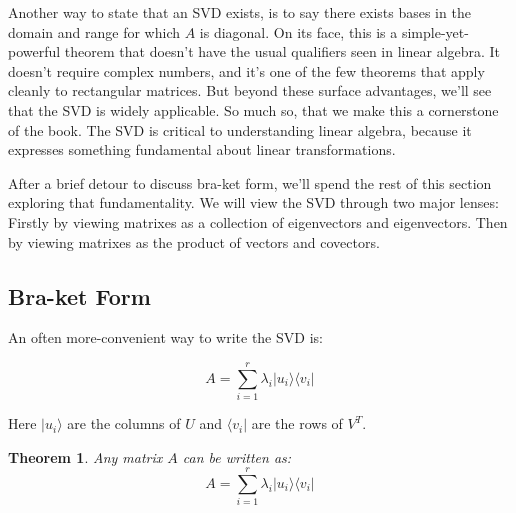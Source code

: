 \documentclass{amsbook}
\newtheorem{theorem}{Theorem}
\begin{document}
Another way to state that an SVD exists, is to say there exists bases in the domain and range for which $A$ is diagonal.  On its face, this is a simple-yet-powerful theorem that doesn't have the usual qualifiers seen in linear algebra.  It doesn't require complex numbers, and it's one of the few theorems that apply cleanly to rectangular matrices.  But beyond these surface advantages, we'll see that the SVD is widely applicable.  So much so, that we make this a cornerstone of the book.  The SVD is critical to understanding linear algebra, because it expresses something fundamental about linear transformations.

After a brief detour to discuss bra-ket form, we'll spend the rest of this section exploring that fundamentality.  We will view the SVD through two major lenses:  Firstly by viewing matrixes as a collection of eigenvectors and eigenvectors.  Then by viewing matrixes as the product of vectors and covectors.

\subsection{Bra-ket Form}

An often more-convenient way to write the SVD is:

$$
A=\sum_{i=1}^r\lambda_i| u _i\rangle\langle v _i|
$$

\noindent
Here $| u _i\rangle$ are the columns of $U$ and $\langle v _i|$ are the rows of $V^T$.

\begin{theorem}
\label{braket_exists}
Any matrix $A$ can be written as:
$$
A=\sum_{i=1}^r\lambda_i| u _i\rangle\langle v _i|
$$
 \end{theorem}
\end{document}

